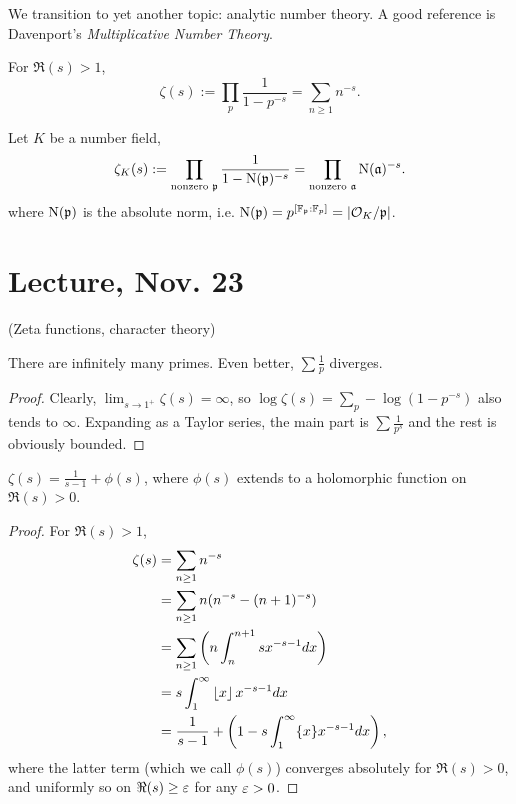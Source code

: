 \documentclass[11pt]{amsart}
\begin{document}
We transition to yet another topic: analytic number theory. A good reference is Davenport's \emph{Multiplicative Number Theory}.


\begin{defn}
    For $\Re(s) > 1$, 
    \[\zeta(s) := \prod_{p} \frac{1}{1-p^{-s}} = \sum_{n\ge 1} n^{-s}.\]
\end{defn}

\begin{defn}
    Let $K$ be a number field,
    \[\zeta_K(s) := \prod_{\text{nonzero }\mathfrak{p}} \frac{1}{1 - \operatorname{N}(\mathfrak{p})^{-s}} = \prod_{\text{nonzero }\mathfrak{a}} \operatorname{N}(\mathfrak{a})^{-s}.\]
    where $\operatorname{N}(\mathfrak{p})$ is the absolute norm, i.e. $\operatorname{N}(\mathfrak{p}) = p^{[\mathbb{F}_{\mathfrak{p}}:\mathbb{F}_p]} = |\mathcal{O}_K/\mathfrak{p}|$. 
\end{defn}



\section{Lecture, Nov. 23}

(Zeta functions, character theory)

\begin{prop}
    There are infinitely many primes. Even better, $\sum \frac1p$ diverges.
\end{prop}

\begin{proof}
    Clearly, $\lim_{s\to 1^+} \zeta(s) = \infty$, so $\log\zeta(s) = \sum_p -\log(1-p^{-s})$ also tends to $\infty$. Expanding as a Taylor series, the main part is $\sum \frac{1}{p^s}$ and the rest is obviously bounded.
\end{proof}

\begin{prop}
    $\zeta(s) = \frac{1}{s-1} + \phi(s)$, where $\phi(s)$ extends to a holomorphic function on $\Re(s) > 0$.
\end{prop}

\begin{proof}
    For $\Re(s) > 1$, 
    \begin{align*}
        \zeta(s) &= \sum_{n\ge 1} n^{-s} \\
        &= \sum_{n\ge 1} n(n^{-s} - (n+1)^{-s}) \\
        &= \sum_{n\ge 1} \left( n\int_n^{n+1} sx^{-s-1}dx \right) \\
        &= s \int_1^{\infty} \left\lfloor x \right\rfloor x^{-s-1}dx \\
        &= \frac{1}{s-1} + \left( 1 - s\int_1^{\infty} \{x\}x^{-s-1}dx \right),
    \end{align*}
    where the latter term (which we call $\phi(s)$) converges absolutely for $\Re(s) > 0$, and uniformly so on $\Re(s)\ge \varepsilon$ for any $\varepsilon>0$.
\end{proof}
\end{document}
